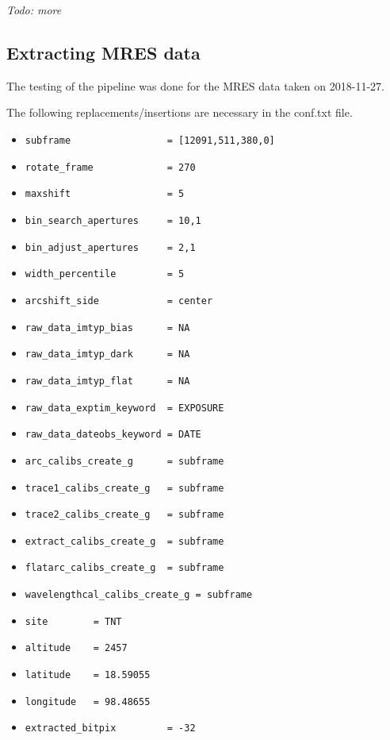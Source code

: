 \documentclass[10pt,a4paper]{article}
\begin{document}
\textit{Todo: more}

\subsection{Extracting MRES data}

The testing of the pipeline was done for the MRES data taken on 2018-11-27.

\noindent The following replacements/insertions are necessary in the conf.txt file. 
\begin{itemize}\setlength\itemsep{0em}
\small
  \item \verb|subframe                 = [12091,511,380,0]|
  \item \verb|rotate_frame             = 270|
  \item \verb|maxshift                 = 5|
  \item \verb|bin_search_apertures     = 10,1|
  \item \verb|bin_adjust_apertures     = 2,1|
  \item \verb|width_percentile         = 5|
  \item \verb|arcshift_side            = center|
  \item \verb|raw_data_imtyp_bias      = NA|
  \item \verb|raw_data_imtyp_dark      = NA|
  \item \verb|raw_data_imtyp_flat      = NA|
  \item \verb|raw_data_exptim_keyword  = EXPOSURE|
  \item \verb|raw_data_dateobs_keyword = DATE|
  \item \verb|arc_calibs_create_g      = subframe|
  \item \verb|trace1_calibs_create_g   = subframe|
  \item \verb|trace2_calibs_create_g   = subframe|
  \item \verb|extract_calibs_create_g  = subframe|
  \item \verb|flatarc_calibs_create_g  = subframe|
  \item \verb|wavelengthcal_calibs_create_g = subframe|
  \item \verb|site        = TNT|
  \item \verb|altitude    = 2457|
  \item \verb|latitude    = 18.59055|
  \item \verb|longitude   = 98.48655|
  \item \verb|extracted_bitpix         = -32|
\end{itemize}
\end{document}
